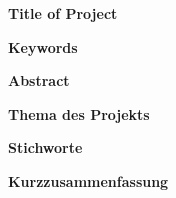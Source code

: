 %
%
\newpage
\thispagestyle{plain}
\clearpage
\hfuzz=12pt       %

\textbf{\IthesisAuthor}

\vspace{0.3cm}
\textbf{Title of Project}

\IthesisTitleEN

\vspace{0.3cm}
\textbf{Keywords}

\begin{minipage}{\textwidth}
\IkeyWordsEN
\end{minipage}

\vspace{0.3cm}
\textbf{Abstract}

\begin{minipage}{\textwidth}
\IabstractEN
\end{minipage}

\vspace{1.0cm}

\textbf{\IthesisAuthor}

\vspace{0.3cm}
\textbf{Thema des Projekts}

\IthesisTitle

\vspace{0.3cm}
\textbf{Stichworte}

\IkeyWordsDE

\vspace{0.3cm}
\textbf{Kurzzusammenfassung}

\IabstractDE

